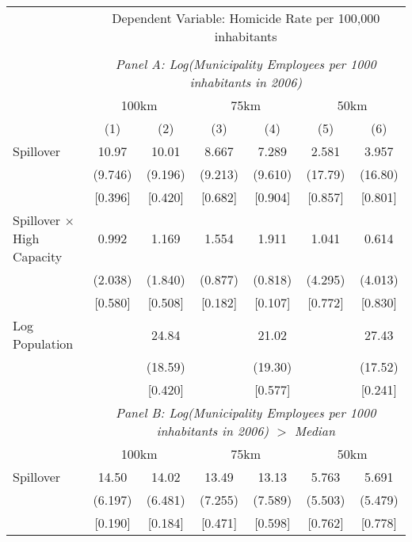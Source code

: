 \documentclass[]{article}
\begin{document}
\begin{adjustbox}{max width=\textwidth}
\begin{tabular}{lcccccc}
\toprule
& \multicolumn{6}{c}{Dependent Variable: Homicide Rate per 100,000 inhabitants} \\
\cmidrule{2-7} \\

& \multicolumn{6}{c}{\textit{Panel A: Log(Municipality Employees per 1000 inhabitants in 2006)}} \\
\cmidrule{2-7}
& \multicolumn{2}{c}{100km} & \multicolumn{2}{c}{75km} & \multicolumn{2}{c}{50km} \\
\cmidrule(lr){2-3} \cmidrule(lr){4-5} \cmidrule(lr){6-7}
& (1) & (2) & (3) & (4) & (5) & (6) \\
\midrule

Spillover & 10.97 & 10.01 & 8.667 & 7.289 & 2.581 & 3.957 \\
& (9.746) & (9.196) & (9.213) & (9.610) & (17.79) & (16.80) \\
& [0.396] & [0.420] & [0.682] & [0.904] & [0.857] & [0.801] \\
[0.5em]

Spillover $\times$ High Capacity & 0.992 & 1.169 & 1.554 & 1.911 & 1.041 & 0.614 \\
& (2.038) & (1.840) & (0.877) & (0.818) & (4.295) & (4.013) \\
& [0.580] & [0.508] & [0.182] & [0.107] & [0.772] & [0.830] \\
[0.5em]

Log Population & & 24.84 & & 21.02 & & 27.43 \\
& & (18.59) & & (19.30) & & (17.52) \\
& & [0.420] & & [0.577] & & [0.241] \\

\midrule
& \multicolumn{6}{c}{\textit{Panel B: Log(Municipality Employees per 1000 inhabitants in 2006) $>$ Median}} \\
\cmidrule{2-7}
& \multicolumn{2}{c}{100km} & \multicolumn{2}{c}{75km} & \multicolumn{2}{c}{50km} \\
\cmidrule(lr){2-3} \cmidrule(lr){4-5} \cmidrule(lr){6-7}

Spillover & 14.50 & 14.02 & 13.49 & 13.13 & 5.763 & 5.691 \\
& (6.197) & (6.481) & (7.255) & (7.589) & (5.503) & (5.479) \\
& [0.190] & [0.184] & [0.471] & [0.598] & [0.762] & [0.778] \\
[0.5em]


\end{tabular}
\end{adjustbox}
\end{document}
